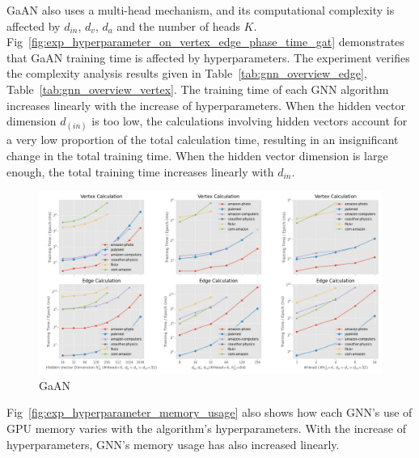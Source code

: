 GaAN also uses a multi-head mechanism, and its computational complexity is affected by $d_{in}$, $d_v$, $d_a$ and the number of heads $K$.
Fig~\ref{fig:exp_hyperparameter_on_vertex_edge_phase_time_gat} demonstrates that GaAN training time is affected by hyperparameters.
The experiment verifies the complexity analysis results given in Table~\ref{tab:gnn_overview_edge}, Table~\ref{tab:gnn_overview_vertex}. The training time of each GNN algorithm increases linearly with the increase of hyperparameters.
When the hidden vector dimension $d_(in)$ is too low, the calculations involving hidden vectors account for a very low proportion of the total calculation time, resulting in an insignificant change in the total training time.
When the hidden vector dimension is large enough, the total training time increases linearly with $d_{in}$.

\begin{figure}
    \centering
    \includegraphics[width=0.7\columnwidth]{figs/experiments/exp_hyperparameter_on_vertex_edge_phase_time_gaan.png}
    \caption{GaAN}
    \label{fig:exp_hyperparameter_on_vertex_edge_phase_time_gaan}
\end{figure}

Fig~\ref{fig:exp_hyperparameter_memory_usage} also shows how each GNN's use of GPU memory varies with the algorithm's hyperparameters.
With the increase of hyperparameters, GNN's memory usage has also increased linearly.

